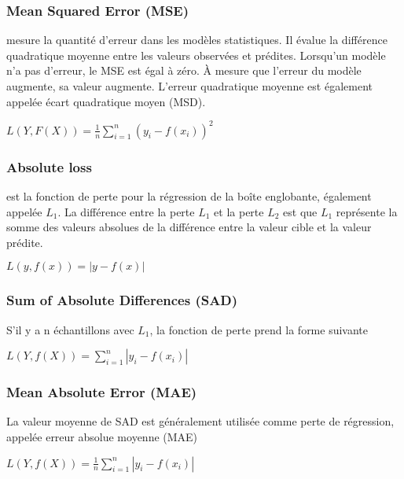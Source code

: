           \subsubsection{Mean Squared Error (MSE)}
          mesure la quantité d'erreur dans les modèles statistiques. Il évalue la différence quadratique moyenne entre les valeurs observées et prédites. Lorsqu'un modèle n'a pas d'erreur, le MSE est égal à zéro. À mesure que l'erreur du modèle augmente, sa valeur augmente. L'erreur quadratique moyenne est également appelée écart quadratique moyen (MSD).
          \begin{center} $L(Y, F(X)) = \frac{1}{n}\sum_{i=1}^{n}(y_i - f(x_i))^2$ \end{center}

          \subsubsection{Absolute loss}
          est la fonction de perte pour la régression de la boîte englobante, également appelée $L_1$. La différence entre la perte $L_1$ et la perte $L_2$ est que $L_1$ représente la somme des valeurs absolues de la différence entre la valeur cible et la valeur prédite.
          \begin{center} $L(y, f(x))=|y-f(x)|$ \end{center}

          \subsubsection{Sum of Absolute Differences (SAD)}
          S'il y a n échantillons avec $L_1$, la fonction de perte prend la forme suivante
          \begin{center} $L(Y, f(X))=\sum_{i=1}^{n}|y_i-f(x_i)|$ \end{center}

          \subsubsection{Mean Absolute Error (MAE)}
          La valeur moyenne de SAD est généralement utilisée comme perte de régression, appelée erreur absolue moyenne (MAE)
          \begin{center} $L(Y, f(X))=\frac{1}{n}\sum_{i=1}^{n}|y_i-f(x_i)|$ \end{center}


